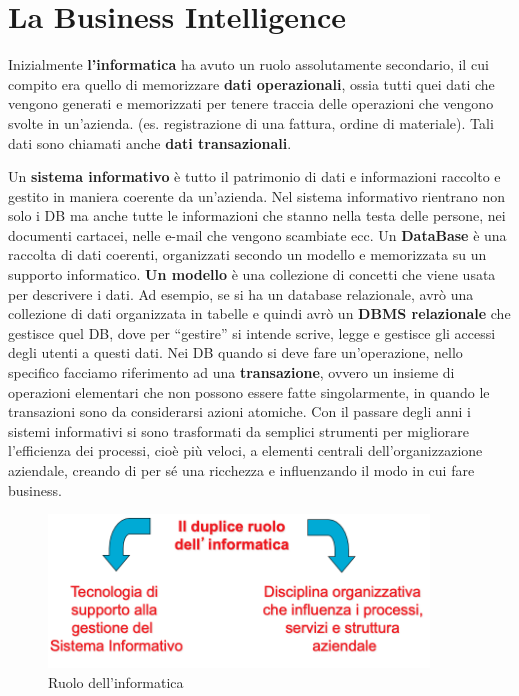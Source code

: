 \section{La Business Intelligence}
Inizialmente \textbf{l’informatica} ha avuto un ruolo assolutamente secondario, il cui compito era quello di memorizzare \textbf{dati operazionali}, ossia tutti quei dati che vengono generati e memorizzati per tenere traccia delle operazioni che vengono svolte in un’azienda. (es. registrazione di una fattura, ordine di materiale). Tali dati sono chiamati anche \textbf{dati transazionali}.

Un \textbf{sistema informativo} è tutto il patrimonio di dati e informazioni raccolto e gestito in maniera coerente da un’azienda. Nel sistema informativo rientrano non solo i DB ma anche tutte le informazioni che stanno nella testa delle persone, nei documenti cartacei, nelle e-mail che vengono scambiate ecc. Un \textbf{DataBase} è una raccolta di dati coerenti, organizzati secondo un modello e memorizzata su un supporto informatico. \textbf{ Un modello} è una collezione di concetti che viene usata per descrivere i dati. Ad esempio, se si ha un database relazionale, avrò una collezione di dati organizzata in tabelle e quindi avrò un \textbf{DBMS relazionale} che gestisce quel DB, dove per “gestire” si intende scrive, legge e gestisce gli accessi degli utenti a questi dati. Nei DB quando si deve fare un’operazione, nello specifico facciamo riferimento ad una \textbf{transazione}, ovvero un insieme di operazioni elementari che non possono essere fatte singolarmente, in quando le transazioni sono da considerarsi azioni atomiche. Con il passare degli anni i sistemi informativi si sono trasformati da semplici strumenti per migliorare l’efficienza dei processi, cioè più veloci, a elementi centrali dell’organizzazione aziendale, creando di per sé una ricchezza e influenzando il modo in cui fare business.
\begin{figure}[H]
	\centering
	\includegraphics[width=0.9\textwidth]{img/Cursor_e_2-IntroDW_pdf}
	\caption{Ruolo dell'informatica}
	\label{fig:cursore2-introdwpdf}
\end{figure}

